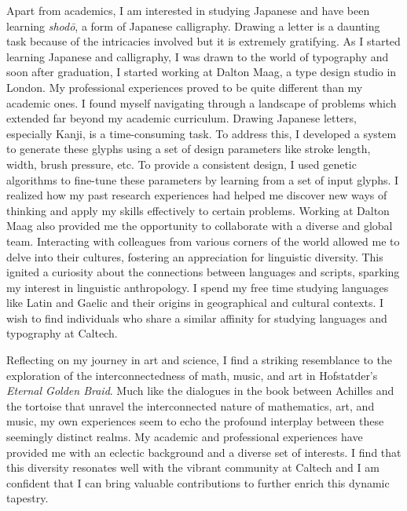 \documentclass[12pt]{article}
\begin{document}
Apart from academics, I am interested in studying Japanese and have been
learning \textit{shodō}, a form of Japanese calligraphy. Drawing a letter is a daunting
task because of the intricacies involved but it is extremely gratifying. As I
started learning Japanese and calligraphy, I was drawn to the world of
typography and soon after graduation, I started working at Dalton Maag, a type
design studio in London. My professional experiences proved to be quite
different than my academic ones. I found myself navigating through a landscape
of problems which extended far beyond my academic curriculum. Drawing Japanese
letters, especially Kanji, is a time-consuming task. To address this, I
developed a system to generate these glyphs using a set of design parameters
like stroke length, width, brush pressure, etc. To provide a consistent design,
I used genetic algorithms to fine-tune these parameters by learning from a set
of input glyphs. I realized how my past research experiences had helped me
discover new ways of thinking and apply my skills effectively to certain
problems. Working at Dalton Maag also provided me the opportunity to collaborate
with a diverse and global team. Interacting with colleagues from various corners
of the world allowed me to delve into their cultures, fostering an appreciation
for linguistic diversity. This ignited a curiosity about the connections between
languages and scripts, sparking my interest in linguistic anthropology. I spend
my free time studying languages like Latin and Gaelic and their origins in
geographical and cultural contexts. I wish to find individuals who share a
similar affinity for studying languages and typography at Caltech.

Reflecting on my journey in art and science, I find a striking resemblance to
the exploration of the interconnectedness of math, music, and art in
Hofstatder's \textit{Eternal Golden Braid}. Much like the dialogues in the book between
Achilles and the tortoise that unravel the interconnected nature of mathematics,
art, and music, my own experiences seem to echo the profound interplay between
these seemingly distinct realms. My academic and professional experiences have
provided me with an eclectic background and a diverse set of interests. I find
that this diversity resonates well with the vibrant community at Caltech and I
am confident that I can bring valuable contributions to further enrich this
dynamic tapestry.
\end{document}
